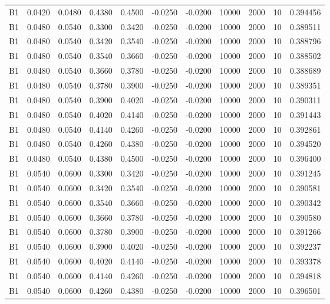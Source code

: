 \documentclass{article}
\begin{document}
\begin{longtable}{l r r r r r r r r r l}
B1 & 0.0420 & 0.0480 & 0.4380 & 0.4500 & -0.0250 & -0.0200 & 10000 & 2000 & 10 & 0.394456 \\
B1 & 0.0480 & 0.0540 & 0.3300 & 0.3420 & -0.0250 & -0.0200 & 10000 & 2000 & 10 & 0.389511 \\
B1 & 0.0480 & 0.0540 & 0.3420 & 0.3540 & -0.0250 & -0.0200 & 10000 & 2000 & 10 & 0.388796 \\
B1 & 0.0480 & 0.0540 & 0.3540 & 0.3660 & -0.0250 & -0.0200 & 10000 & 2000 & 10 & 0.388502 \\
B1 & 0.0480 & 0.0540 & 0.3660 & 0.3780 & -0.0250 & -0.0200 & 10000 & 2000 & 10 & 0.388689 \\
B1 & 0.0480 & 0.0540 & 0.3780 & 0.3900 & -0.0250 & -0.0200 & 10000 & 2000 & 10 & 0.389351 \\
B1 & 0.0480 & 0.0540 & 0.3900 & 0.4020 & -0.0250 & -0.0200 & 10000 & 2000 & 10 & 0.390311 \\
B1 & 0.0480 & 0.0540 & 0.4020 & 0.4140 & -0.0250 & -0.0200 & 10000 & 2000 & 10 & 0.391443 \\
B1 & 0.0480 & 0.0540 & 0.4140 & 0.4260 & -0.0250 & -0.0200 & 10000 & 2000 & 10 & 0.392861 \\
B1 & 0.0480 & 0.0540 & 0.4260 & 0.4380 & -0.0250 & -0.0200 & 10000 & 2000 & 10 & 0.394520 \\
B1 & 0.0480 & 0.0540 & 0.4380 & 0.4500 & -0.0250 & -0.0200 & 10000 & 2000 & 10 & 0.396400 \\
B1 & 0.0540 & 0.0600 & 0.3300 & 0.3420 & -0.0250 & -0.0200 & 10000 & 2000 & 10 & 0.391245 \\
B1 & 0.0540 & 0.0600 & 0.3420 & 0.3540 & -0.0250 & -0.0200 & 10000 & 2000 & 10 & 0.390581 \\
B1 & 0.0540 & 0.0600 & 0.3540 & 0.3660 & -0.0250 & -0.0200 & 10000 & 2000 & 10 & 0.390342 \\
B1 & 0.0540 & 0.0600 & 0.3660 & 0.3780 & -0.0250 & -0.0200 & 10000 & 2000 & 10 & 0.390580 \\
B1 & 0.0540 & 0.0600 & 0.3780 & 0.3900 & -0.0250 & -0.0200 & 10000 & 2000 & 10 & 0.391266 \\
B1 & 0.0540 & 0.0600 & 0.3900 & 0.4020 & -0.0250 & -0.0200 & 10000 & 2000 & 10 & 0.392237 \\
B1 & 0.0540 & 0.0600 & 0.4020 & 0.4140 & -0.0250 & -0.0200 & 10000 & 2000 & 10 & 0.393378 \\
B1 & 0.0540 & 0.0600 & 0.4140 & 0.4260 & -0.0250 & -0.0200 & 10000 & 2000 & 10 & 0.394818 \\
B1 & 0.0540 & 0.0600 & 0.4260 & 0.4380 & -0.0250 & -0.0200 & 10000 & 2000 & 10 & 0.396501 \\

\end{longtable}
\end{document}
